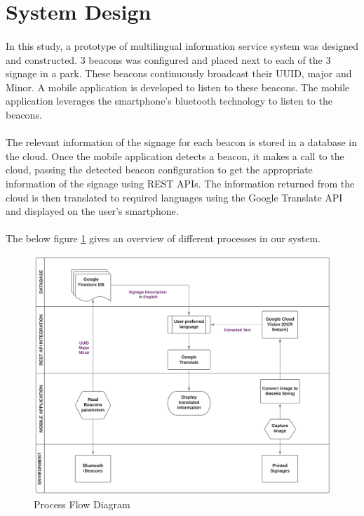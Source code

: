 \documentclass[12pt]{article}
\begin{document}

\section{System Design}
\label{system}
\paragraph{}In this study, a prototype of multilingual information service system was designed and constructed. 3 beacons was configured and placed next to each of the 3 signage in a park. These beacons continuously broadcast their UUID, major and Minor. A mobile application is developed to listen to these beacons. The mobile application leverages the smartphone’s bluetooth technology to listen to the beacons.

\paragraph{}The relevant information of the signage for each beacon is stored in a database in the cloud. Once the mobile application detects a beacon, it makes a call to the cloud, passing the detected beacon configuration to get the appropriate information of the signage using REST APIs. The information returned from the cloud is then translated to required languages using the Google Translate API and displayed on the user’s smartphone.

\paragraph{}The below figure \ref{fig:system} gives an overview of different processes in our system.

\begin{figure}[H]
	\centering
	\includegraphics[width=1\linewidth]{media/Architecture-3.png}
	\caption{Process Flow Diagram}
	\label{fig:system}
\end{figure} 
\end{document}
